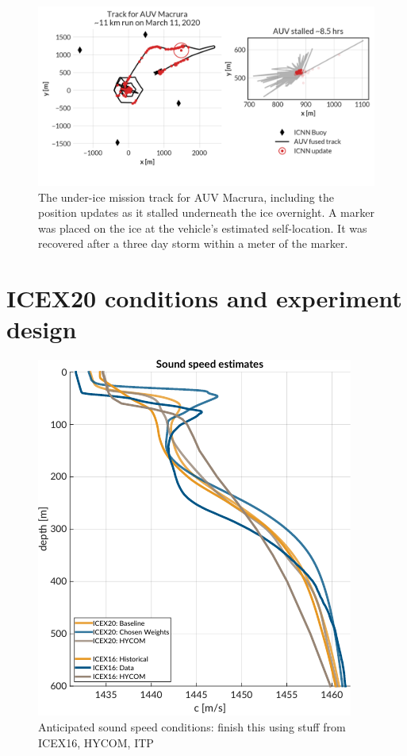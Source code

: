 \begin{figure}[h!]
	\centering
	\includegraphics[width=\columnwidth]{figs/auv-track-update.png}
	\caption{The under-ice mission track for AUV Macrura, including the position updates as it stalled underneath the ice overnight. A marker was placed on the ice at the vehicle's estimated self-location. It was recovered after a three day storm within a meter of the marker.}
	\label{fig:vehicleRecovery}
\end{figure}

\clearpage
\section{ICEX20 conditions and experiment design}

\begin{figure}[h!]
	\centering
	\includegraphics[width=\reprintcolumnwidth]{figs/ssp-gvel-icex20-icex16.pdf}
	\caption{Anticipated sound speed conditions: finish this using stuff from ICEX16, HYCOM, ITP}
	\label{fig:sspExpectation}
\end{figure}

